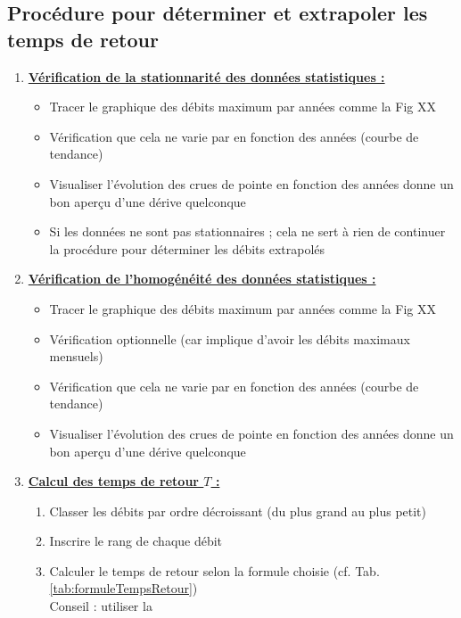 \subsection{Procédure pour déterminer et extrapoler les temps de retour}
\begin{enumerate}
    \item \textbf{\underline{Vérification de la stationnarité des données statistiques :}} \\
    \begin{itemize}
        \item Tracer le graphique des débits maximum par années comme la Fig XX
        \item Vérification que cela ne varie par en fonction des années (courbe de tendance)
        \item Visualiser l'évolution des crues de pointe en fonction des années donne un bon aperçu d'une dérive quelconque
        \item \Warning Si les données ne sont pas stationnaires ; cela ne sert à rien de continuer la procédure pour déterminer les débits extrapolés
    \end{itemize}
    \bigskip
    \item \textbf{\underline{Vérification de l'homogénéité des données statistiques :}}
    \begin{itemize}
        \item Tracer le graphique des débits maximum par années comme la Fig XX
        \item Vérification optionnelle (car implique d'avoir les débits maximaux mensuels)
        \item Vérification que cela ne varie par en fonction des années (courbe de tendance)
        \item Visualiser l'évolution des crues de pointe en fonction des années donne un bon aperçu d'une dérive quelconque
    \end{itemize}
    \bigskip
    \item \textbf{\underline{Calcul des temps de retour $T$ :}}
    \begin{enumerate}
        \item Classer les débits par ordre décroissant (du plus grand au plus petit)
        \item Inscrire le rang de chaque débit
        \item Calculer le temps de retour selon la formule choisie (cf. Tab. \ref{tab:formuleTempsRetour}) \\
        Conseil : utiliser la  \\

\end{enumerate}
\end{enumerate}
